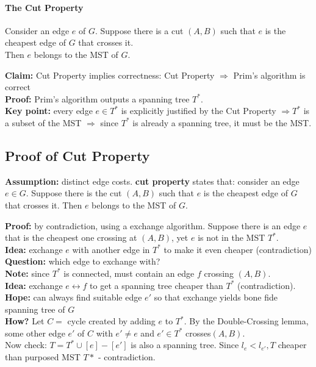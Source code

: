 \documentclass{scrartcl}
\begin{document}
\paragraph{The Cut Property}

Consider an edge $e$ of $G$. Suppose there is a cut $(A, B)$ such that $e$ is
the cheapest edge of $G$ that crosses it.\\
Then $e$ belongs to the MST of $G$.

{\bf Claim: } Cut Property implies correctness: Cut Property $\Rightarrow$
Prim's algorithm is correct\\
{\bf Proof: } Prim's algorithm outputs a spanning tree $T^*$. \\
{\bf Key point: } every edge $e \in T^*$ is explicitly justified by the Cut
Property $\Rightarrow T^*$ is a subset of the MST $\Rightarrow$ since $T^*$ is
already a spanning tree, it must be the MST.


\subsection{Proof of Cut Property}
\label{sec:5-5} {\bf Assumption: } distinct edge costs. {\bf cut property
}states that: consider an edge $e \in G$. Suppose there is the cut $(A, B)$ such
that $e$ is the cheapest edge of $G$ that crosses it. Then $e$ belongs to the
MST of $G$.

{\bf Proof: } by contradiction, using a exchange algorithm. Suppose there is an
edge $e$ that is the cheapest one crossing at $(A, B)$, yet $e$ is not in the
MST $T^*$.\\
{\bf Idea: } exchange $e$ with another edge in $T^*$ to make it even cheaper
(contradiction) \\
{\bf Question: } which edge to exchange with?\\
{\bf Note: } since $T^*$ is connected, must contain an edge $f$ crossing $(A,
B)$.\\
{\bf Idea: } exchange $e \leftrightarrow f$ to get a spanning tree cheaper than
$T^*$ (contradiction).\\
{\bf Hope: } can always find suitable edge $e'$ so that exchange yields bone
fide spanning tree of $G$\\
{\bf How? } Let $C =$ cycle created by adding $e$ to $T^*$. By the
Double-Crossing lemma, some other edge $e'$ of $C$ with $e' \neq e$ and $e' \in
T^*$ crosses$(A, B)$.\\
Now check: $T = T^* \cup [e] - [e']$ is also a spanning tree. Since $l_e <
l_{e'}, T$ cheaper than purposed MST $T*$ - contradiction.
\end{document}
